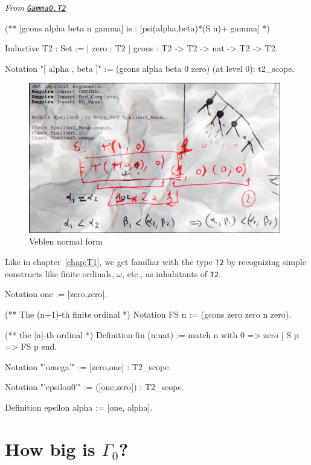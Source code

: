 {\noindent\emph{From \href{../theories/html/hydras.Gamma0.T2.html\#T2}%
{\texttt{Gamma0.T2}}}
\begin{Coqsrc}
(**  [gcons alpha beta n gamma] is : [psi(alpha,beta)*(S n)+ gamma]  *)

Inductive T2 : Set :=
| zero : T2
| gcons : T2 -> T2  -> nat -> T2 -> T2.

Notation "[ alpha , beta ]" := (gcons alpha beta 0 zero)
                                 (at level 0): t2_scope.
\end{Coqsrc}

\begin{figure}[h]
  \centering
  \includegraphics[width=11cm]{epsilon0.jpg}
  \caption{Veblen normal form}
  \label{fig:gamma0}
\end{figure}

Like in chapter~\ref{chap:T1}, we get familiar with the type \texttt{T2} by recognizing simple constructs like finite ordinals, $\omega$, etc., as inhabitants of \texttt{T2}.

\begin{Coqsrc}
Notation  one  := [zero,zero].

(** The (n+1)-th finite ordinal *)
Notation FS n := (gcons zero zero n zero).

(** the [n]-th ordinal  *)
Definition fin (n:nat) := match n with 0 => zero | S p => FS p end.

Notation "'omega'"  := [zero,one] : T2_scope.
\end{Coqsrc}


\begin{Coqsrc}
Notation "'epsilon0'"  := ([one,zero]) : T2_scope.

Definition epsilon alpha := [one, alpha].
\end{Coqsrc}

\section{How big is \texorpdfstring{$\Gamma_0$}{\texttt{Gamma0}}?}

}
